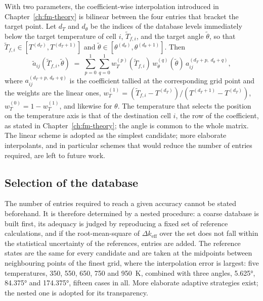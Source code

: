 With two parameters, the coefficient-wise interpolation introduced in
Chapter~\ref{ch:fm-theory} is bilinear between the four entries that bracket
the target point. Let $d_T$ and $d_\theta$ be the indices of the database
levels immediately below the target temperature of cell $i$,
$\tilde T_{f,i}$, and the target angle $\tilde\theta$, so that
$\tilde T_{f,i}\in[T^{(d_T)},T^{(d_T+1)}]$ and
$\tilde\theta\in[\theta^{(d_\theta)},\theta^{(d_\theta+1)}]$. Then
%
\begin{equation}
  \tilde a_{ij}(\tilde T_{f,i},\tilde\theta) \;=\;
  \sum_{p=0}^{1}\sum_{q=0}^{1}
  w_T^{(p)}\!\left(\tilde T_{f,i}\right)\,
  w_\theta^{(q)}\!\left(\tilde\theta\right)\,
  a_{ij}^{(d_T+p,\;d_\theta+q)},
  \label{cs:eq:interp}
\end{equation}
%
where $a_{ij}^{(d_T+p,\,d_\theta+q)}$ is the coefficient tallied at the
corresponding grid point and the weights are the linear ones,
$w_T^{(1)} = (\tilde T_{f,i} - T^{(d_T)})/(T^{(d_T+1)} - T^{(d_T)})$,
$w_T^{(0)} = 1 - w_T^{(1)}$, and likewise for $\theta$. The temperature that
selects the position on the temperature axis is that of the destination cell
$i$, the row of the coefficient, as stated in Chapter~\ref{ch:fm-theory}; the
angle is common to the whole matrix. The linear scheme is adopted as the simplest candidate; more elaborate
interpolants, and in particular schemes that would reduce the number of
entries required, are left to future work.

\subsection{Selection of the database}\label{cs:sec:selection}

The number of entries required to reach a given accuracy cannot be stated
beforehand. It is therefore determined by a nested procedure: a coarse database is built first, its
adequacy is judged by reproducing a fixed set of reference calculations, and
if the root-mean-square of $\Delta k_{\mathrm{eff}}$ over the set does not
fall within the statistical uncertainty of the references, entries are added.
The reference states are the same for every candidate and are taken at the
midpoints between neighbouring points of the finest grid, where the
interpolation error is largest: five temperatures, 350, 550, 650, 750 and
\SI{950}{K}, combined with three angles, \ang{5.625}, \ang{84.375} and
\ang{174.375}, fifteen cases in all. More elaborate adaptive strategies exist;
the nested one is adopted for its transparency.

